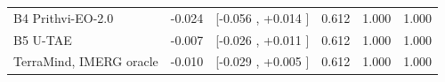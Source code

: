 \begin{tabular}{lccccc}
B4 Prithvi-EO-2.0
& -0.024%
& [-0.056%
, +0.014%
]
& 0.612%
& 1.000%
& 1.000%
\\
B5 U-TAE
& -0.007%
& [-0.026%
, +0.011%
]
& 0.612%
& 1.000%
& 1.000%
\\
TerraMind, IMERG oracle
& -0.010%
& [-0.029%
, +0.005%
]
& 0.612%
& 1.000%
& 1.000%
\\
\bottomrule
\end{tabular}
